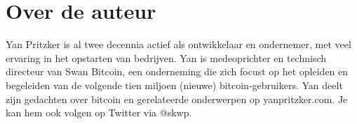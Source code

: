 \chapter*{Over de auteur}

Yan Pritzker is al twee decennia actief als ontwikkelaar en ondernemer, met veel ervaring in het opstarten van bedrijven. Yan is medeoprichter en technisch directeur van Swan Bitcoin, een onderneming die zich focust op het opleiden en begeleiden van de volgende tien miljoen (nieuwe) bitcoin-gebruikers. Yan deelt zijn gedachten over bitcoin en gerelateerde onderwerpen op yanpritzker.com. Je kan hem ook volgen op Twitter via @skwp.
